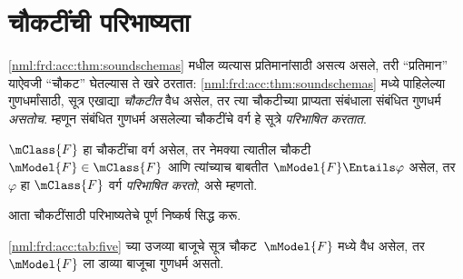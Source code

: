 \section{चौकटींची परिभाष्यता}\label{nml:frd:def:sec}

\ref{nml:frd:acc:thm:soundschemas} मधील व्यत्यास प्रतिमानांसाठी
असत्य असले, तरी ``प्रतिमान'' याऐवजी ``चौकट'' घेतल्यास
ते खरे ठरतात: \ref{nml:frd:acc:thm:soundschemas} मध्ये पाहिलेल्या
गुणधर्मांसाठी, सूत्र एखाद्या \emph{चौकटीत} वैध
असेल, तर त्या चौकटीच्या प्राप्यता संबंधाला संबंधित गुणधर्म
\emph{असतोच}. म्हणून संबंधित गुणधर्म असलेल्या चौकटींचे
वर्ग हे सूत्रे \emph{परिभाषित करतात}.

\begin{defn}
  $\mClass{F}$ हा चौकटींचा वर्ग असेल, तर नेमक्या
  त्यातील चौकटी~$\mModel{F} \in \mClass{F}$
  आणि त्यांच्याच बाबतीत $\mModel{F} \Entails \varphi$ असेल,
  तर $\varphi$ हा $\mClass{F}$ वर्ग \emph{परिभाषित करतो},
  असे म्हणतो.
\end{defn}

आता चौकटींसाठी परिभाष्यतेचे पूर्ण निष्कर्ष सिद्ध करू.

\begin{thm}\label{nml:frd:def:thm:fullCorrespondence}
\ref{nml:frd:acc:tab:five} च्या उजव्या बाजूचे सूत्र
चौकट~$\mModel{F}$ मध्ये वैध असेल, तर $\mModel{F}$ ला
डाव्या बाजूचा गुणधर्म असतो.
\end{thm}

